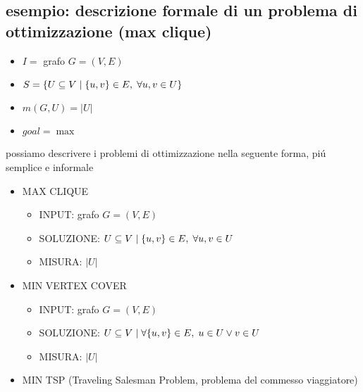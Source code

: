 
\subsection*{esempio: descrizione formale di un problema di ottimizzazione (max clique)}
\begin{flushleft}
	\begin{itemize}
		\item $I=$ grafo $G=(V,E)$
		\item $S= \{U\subseteq V\hspace{0.1cm}\vert\hspace{0.1cm}\{u,v\}\in E,\hspace{0.1cm}\forall u,v\in U\}$
		\item $m(G,U)=|U|$
		\item $goal=\max$
	\end{itemize}
	\vspace{0.5cm}
	possiamo descrivere i problemi di ottimizzazione nella seguente forma, pi\'u semplice e informale
	\begin{itemize}
		\item MAX CLIQUE
		\begin{itemize}
			\item INPUT: grafo $G=(V,E)$
			\item SOLUZIONE: $U\subseteq V\hspace{0.1cm}\vert\hspace{0.1cm}\{u,v\}\in E,\hspace{0.1cm}\forall u,v\in U$
			\item MISURA: $|U|$
		\end{itemize}
		\item MIN VERTEX COVER
		\begin{itemize}
			\item INPUT: grafo $G=(V,E)$
			\item SOLUZIONE: $U\subseteq V\hspace{0.1cm}\vert\hspace{0.1cm}\forall\{u,v\}\in E,\hspace{0.1cm}u\in U\vee v\in U$
			\item MISURA: $|U|$
		\end{itemize}
		\item MIN TSP (Traveling Salesman Problem, problema del commesso viaggiatore)

\end{itemize}
\end{flushleft}
